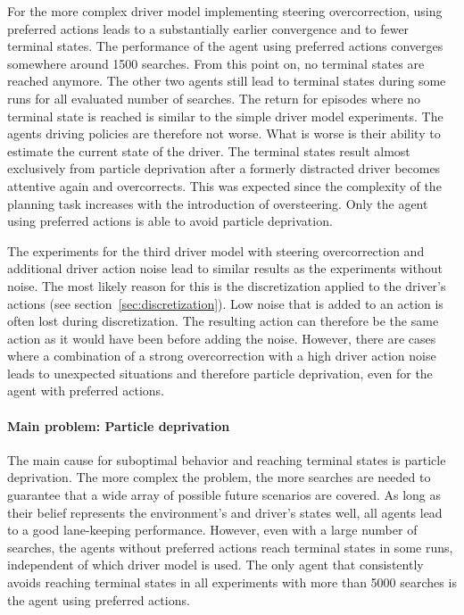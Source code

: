For the more complex driver model implementing steering overcorrection, using preferred actions leads to a substantially earlier convergence and to fewer terminal states. The performance of the agent using preferred actions converges somewhere around 1500 searches. From this point on, no terminal states are reached anymore. The other two agents still lead to terminal states during some runs for all evaluated number of searches. The return for episodes where no terminal state is reached is similar to the simple driver model experiments. The agents driving policies are therefore not worse. What is worse is their ability to estimate the current state of the driver. The terminal states result almost exclusively from particle deprivation after a formerly distracted driver becomes attentive again and overcorrects. This was expected since the complexity of the planning task increases with the introduction of oversteering. Only the agent using preferred actions is able to avoid particle deprivation.

The experiments for the third driver model with steering overcorrection and additional driver action noise lead to similar results as the experiments without noise. The most likely reason for this is the discretization applied to the driver's actions (see section~\ref{sec:discretization}). Low noise that is added to an action is often lost during discretization. The resulting action can therefore be the same action as it would have been before adding the noise. However, there are cases where a combination of a strong overcorrection with a high driver action noise leads to unexpected situations and therefore particle deprivation, even for the agent with preferred actions.


\paragraph{Main problem: Particle deprivation}

The main cause for suboptimal behavior and reaching terminal states is particle deprivation. The more complex the problem, the more searches are needed to guarantee that a wide array of possible future scenarios are covered. As long as their belief represents the environment's and driver's states well, all agents lead to a good lane-keeping performance. However, even with a large number of searches, the agents without preferred actions reach terminal states in some runs, independent of which driver model is used. The only agent that consistently avoids reaching terminal states in all experiments with more than 5000 searches is the agent using preferred actions. 

